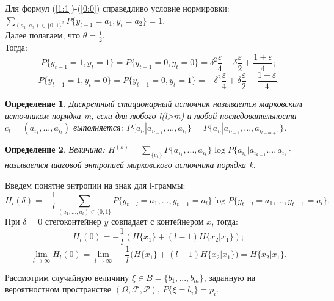 ﻿\documentclass[a4paper,12pt]{article}
\theoremstyle{plain}
\newtheorem{definition}{Определение}[section]
\begin{document}
Для формул (\ref{1:1})-(\ref{0:0}) справедливо условие нормировки:\\
$ \sum_{(a_1, a_2)\in \{0, 1\}^2}P\{y_{t-1}=a_1, y_t=a_2\} =1.$\\
Далее полагаем, что $\theta=\frac{1}{2}$.\\
Тогда: 
\begin{equation}
	P\{y_{t-1}=1, y_t = 1 \}=P\{y_{t-1}=0, y_t = 0 \}= \delta^2\frac{\varepsilon}{4}-\delta\frac{\varepsilon}{2}+\frac{1+\varepsilon}{4};
\end{equation}
\begin{equation}
	P\{y_{t-1}=1, y_t = 0 \}=P\{y_{t-1}=0, y_t = 1 \}= -\delta^2\frac{\varepsilon}{4}+\delta\frac{\varepsilon}{2}+\frac{1-\varepsilon}{4}.
\end{equation}
\begin{definition}
	\cite{duhin} Дискретный стационарный источник называется марковским источником порядка m, если для любого l(l>m) и любой последовательности $c_l=(a_{i_1}, ..., a_{i_l})$ выполняется: $P\{a_{i_l}|a_{i_{l-1}}, ..., a_{i_1}\} = P\{a_{i_l}|a_{i_{l-1}}, ..., a_{i_{l-m+1}}\}.$
\end{definition}
\begin{definition}
	\cite{duhin} Величина: 
	$H^{(k)} = \sum_{\{c_k\}}P\{a_{i_1}, ..., a_{i_k}\} \log{P\{a_{i_k}|a_{i_{k-1}} ..., a_{i_1}\} }$ называется шаговой энтропией марковского источника порядка k.
\end{definition}

Введем понятие энтропии на знак для l-граммы:\\
\begin{equation}
	\label{entropy L}
	H_l(\delta) = -\frac{1}{l} \sum_{(a_1, ..., a_l)\in \{0, 1\}}P\{y_{t-l}=a_1,..., y_{t-1}=a_l\}\log{P\{y_{t-l}=a_1, ..., y_{t-1}=a_l\}}.
\end{equation}
При $\delta = 0$ стегоконтейнер $y$ совпадает с контейнером $x$, тогда:\\
\begin{equation}
	H_l(0)=-\frac{1}{l}(H\{x_1\}+(l-1)H\{x_2|x_1\});
\end{equation}
\begin{equation}
	\lim_{l \to \infty}H_l(0)= \lim_{l \to \infty}-\frac{1}{l}(H\{x_1\}+(l-1)H\{x_2|x_1\}) = H\{x_2|x_1\}.
\end{equation}

Рассмотрим случайную величину $\xi \in B=\{b_1,...,b_m\}$, заданную  на вероятностном пространстве $(\Omega,\mathcal{F},\mathcal{P} )$, $P\{\xi=b_i\}=p_i$.
\end{document}
